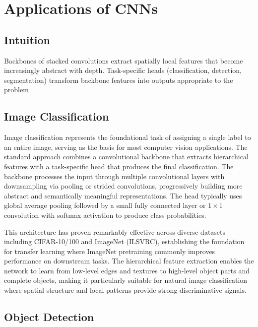 
\section{Applications of CNNs }
\label{sec:cnn-applications}

\subsection*{Intuition}
Backbones of stacked convolutions extract spatially local features that become increasingly abstract with depth. Task-specific heads (classification, detection, segmentation) transform backbone features into outputs appropriate to the problem \cite{GoodfellowEtAl2016,Prince2023}.
\subsection{Image Classification}

Image classification represents the foundational task of assigning a single label to an entire image, serving as the basis for most computer vision applications. The standard approach combines a convolutional backbone that extracts hierarchical features with a task-specific head that produces the final classification. The backbone processes the input through multiple convolutional layers with downsampling via pooling or strided convolutions, progressively building more abstract and semantically meaningful representations. The head typically uses global average pooling followed by a small fully connected layer or $1\times1$ convolution with softmax activation to produce class probabilities.

This architecture has proven remarkably effective across diverse datasets including CIFAR-10/100 and ImageNet (ILSVRC), establishing the foundation for transfer learning where ImageNet pretraining commonly improves performance on downstream tasks. The hierarchical feature extraction enables the network to learn from low-level edges and textures to high-level object parts and complete objects, making it particularly suitable for natural image classification where spatial structure and local patterns provide strong discriminative signals.

\subsection{Object Detection}

